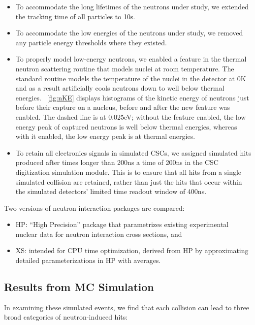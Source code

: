 \begin{itemize}
	\item To accommodate the long lifetimes of the neutrons under study, we extended the tracking time of all particles to 10\unit{s}.
	\item To accommodate the low energies of the neutrons under study, we removed any particle energy thresholds where they existed.
	\item To properly model low-energy neutrons, we enabled a feature in the \GEANTfour thermal neutron scattering routine that models nuclei at room temperature. The standard \GEANTfour routine models the temperature of the nuclei in the detector at 0\unit{K} and as a result artificially cools neutrons down to well below thermal energies. \Fig~\ref{fig:nKE} displays histograms of the kinetic energy of neutrons just before their capture on a nucleus, before and after the new feature was enabled. The dashed line is at 0.025\unit{eV}; without the feature enabled, the low energy peak of captured neutrons is well below thermal energies, whereas with it enabled, the low energy peak is at thermal energies.
	\item To retain all electronics signals in simulated CSCs, we assigned simulated hits produced after times longer than 200\unit{ns} a time of 200\unit{ns} in the CSC digitization simulation module. This is to ensure that all hits from a single simulated \pp collision are retained, rather than just the hits that occur within the simulated detectors' limited time readout window of 400\unit{ns}.
\end{itemize}

Two versions of \GEANTfour neutron interaction packages are compared:

\begin{itemize}
	\item HP: ``High Precision'' package that parametrizes existing experimental nuclear data for neutron interaction cross sections, and
	\item XS: intended for CPU time optimization, derived from HP by approximating detailed parameterizations in HP with averages.
\end{itemize}

\subsection{Results from MC Simulation}
In examining these simulated events, we find that each \pp collision can lead to three broad categories of neutron-induced hits:

